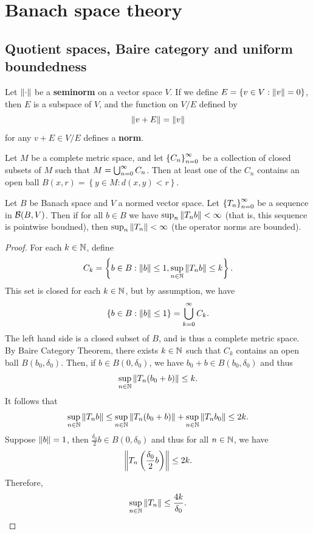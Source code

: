 \documentclass[a4paper]{article}
\begin{document}
\maketitle

\tableofcontents

\section{Banach space theory}

\subsection{Quotient spaces, Baire category and 
uniform boundedness}

\begin{thm}
Let $\left\lVert \cdot\right\rVert$ be a \textbf{seminorm} on a vector 
space $V$. If we define $E = \left\{ v \in V: \left\lVert v\right\rVert 
= 0 \right\}$, then $E$ is a subspace of $V$, 
and the function on $V / E$ defined by 
\[
\left\lVert v + E\right\rVert = \left\lVert v\right\rVert
\]
for any $v + E \in V / E$ defines a \textbf{norm}.
\end{thm}

\begin{thm}
Let $M$ be a complete metric space, and let $\left\{ C_n \right\}_{n=0}^\infty$
be a collection of closed subsets of $M$ such that 
$M = \bigcup_{n=0}^\infty C_n$. Then at least one of the $C_n$ contains
an open ball $B(x, r) = \left\{ y \in M : d(x, y) < r \right\}$.
\end{thm}

\begin{thm}
Let $B$ be Banach space and $V$ a normed vector space. 
Let $\left\{ T_n \right\}_{n=0}^\infty$ be a sequence in $\mathcal{B}(B, V)$.
Then if for all $b \in B$ we have $\sup_n \left\lVert T_n b\right\rVert < \infty$
(that is, this sequence is pointwise boudned),
then $\sup_n \left\lVert T_n\right\rVert < \infty$ (the operator norms are 
bounded).
\end{thm}

\begin{proof}
For each $k \in \mathbb{N}$, define 
\[
C_k = \left\{ b \in B: \left\lVert b\right\rVert \leq 1, \sup_{n \in \mathbb{N}} 
\left\lVert T_n b\right\rVert \leq k \right\}.
\]
This set is closed for each $k \in \mathbb{N}$, but by assumption, 
we have 
\[
\left\{ b \in B: \left\lVert b\right\rVert \leq 1 \right\} = \bigcup_{k=0}^\infty C_k.
\]
The left hand side is a closed subset of $B$, and is thus 
a complete metric space. By Baire Category Theorem, 
there exists $k \in \mathbb{N}$ such that $C_k$ contains an open 
ball $B(b_0, \delta_0)$. Then, if $b \in B(0, \delta_0)$, 
we have $b_0 + b \in B(b_0, \delta_0)$ and thus 
\[
\sup_{n \in \mathbb{N}} \left\lVert T_n (b_0 + b)\right\rVert \leq k.
\]
It follows that 
\[
\sup_{n \in \mathbb{N}} \left\lVert T_n b\right\rVert \leq \sup_{n \in \mathbb{N}}
\left\lVert T_n (b_0 + b)\right\rVert + \sup_{n \in \mathbb{N}} \left\lVert T_n b_0\right\rVert
\leq 2k.
\]
Suppose $\left\lVert b\right\rVert = 1$, then $\frac{\delta_0}{2} b \in 
B(0, \delta_0)$ and thus for all $n \in \mathbb{N}$, 
we have 
\[
\left\lVert T_n \left( \frac{\delta_0}{2} b \right)\right\rVert \leq 2k.
\]
Therefore, 
\[
\sup_{n \in \mathbb{N}} \left\lVert T_n\right\rVert \leq \frac{4k}{\delta_0}.
\]
\end{proof}
\end{document}
